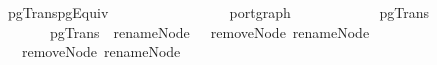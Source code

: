 \ pgTrans{\isacharunderscore}pgEquiv{\isacharcolon}\isanewline
\ \ \ {\isachardoublequoteopen}\ {\isasymapprox}\ \isanewline
\ \ \ \ \ \ \ \ \ \ \ {\isachardoublequoteopen}port{\isacharunderscore}graph\ \isanewline
\ \ \ \ \ \ \ \ \ \ \ {\isachardoublequoteopen}pgTrans\ \isanewline
\ \ \ \ \ \ \ {\isachardoublequoteopen}pgTrans\ \ {\isacharparenleft}renameNode\ \ \ {\isacharparenleft}removeNode\ {\isacharparenleft}renameNode\ \ \ \isanewline
{}\ {\isachardoublequoteopen}\ {\isasymapprox}\ {\isacharparenleft}removeNode\ {\isacharparenleft}renameNode\ \ \ 
